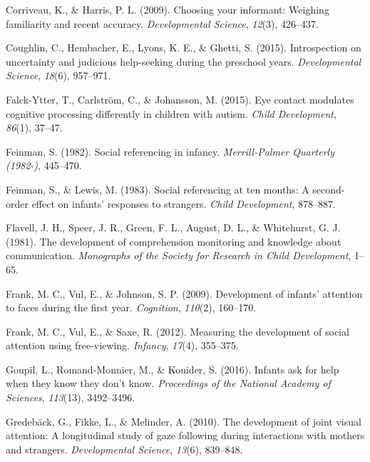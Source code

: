 \documentclass[floatsintext,man]{apa6}
\theoremstyle{definition}
\theoremstyle{definition}
\theoremstyle{definition}
\theoremstyle{remark}
\begin{document}
\hypertarget{ref-corriveau2009choosing}{}
Corriveau, K., \& Harris, P. L. (2009). Choosing your informant:
Weighing familiarity and recent accuracy. \emph{Developmental Science},
\emph{12}(3), 426--437.

\hypertarget{ref-coughlin2015introspection}{}
Coughlin, C., Hembacher, E., Lyons, K. E., \& Ghetti, S. (2015).
Introspection on uncertainty and judicious help-seeking during the
preschool years. \emph{Developmental Science}, \emph{18}(6), 957--971.

\hypertarget{ref-falck2015eye}{}
Falck-Ytter, T., Carlström, C., \& Johansson, M. (2015). Eye contact
modulates cognitive processing differently in children with autism.
\emph{Child Development}, \emph{86}(1), 37--47.

\hypertarget{ref-feinman1982social}{}
Feinman, S. (1982). Social referencing in infancy. \emph{Merrill-Palmer
Quarterly (1982-)}, 445--470.

\hypertarget{ref-feinman1983social}{}
Feinman, S., \& Lewis, M. (1983). Social referencing at ten months: A
second-order effect on infants' responses to strangers. \emph{Child
Development}, 878--887.

\hypertarget{ref-flavell1981development}{}
Flavell, J. H., Speer, J. R., Green, F. L., August, D. L., \&
Whitehurst, G. J. (1981). The development of comprehension monitoring
and knowledge about communication. \emph{Monographs of the Society for
Research in Child Development}, 1--65.

\hypertarget{ref-frank2009development}{}
Frank, M. C., Vul, E., \& Johnson, S. P. (2009). Development of infants'
attention to faces during the first year. \emph{Cognition},
\emph{110}(2), 160--170.

\hypertarget{ref-frank2012measuring}{}
Frank, M. C., Vul, E., \& Saxe, R. (2012). Measuring the development of
social attention using free-viewing. \emph{Infancy}, \emph{17}(4),
355--375.

\hypertarget{ref-goupil2016infants}{}
Goupil, L., Romand-Monnier, M., \& Kouider, S. (2016). Infants ask for
help when they know they don't know. \emph{Proceedings of the National
Academy of Sciences}, \emph{113}(13), 3492--3496.

\hypertarget{ref-gredeback2010development}{}
Gredebäck, G., Fikke, L., \& Melinder, A. (2010). The development of
joint visual attention: A longitudinal study of gaze following during
interactions with mothers and strangers. \emph{Developmental Science},
\emph{13}(6), 839--848.
\end{document}

